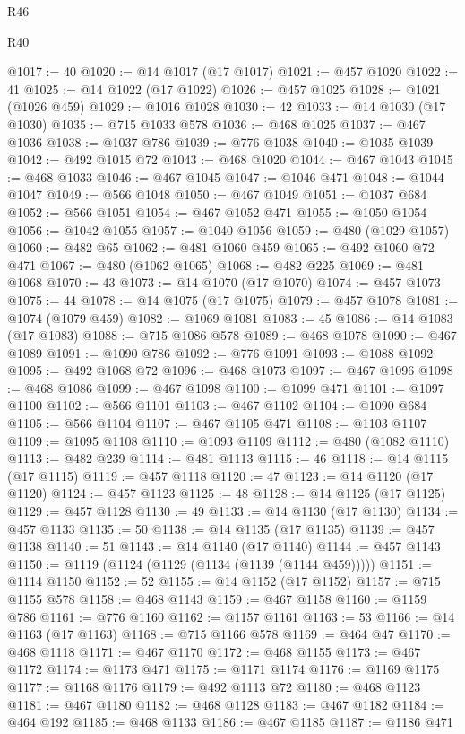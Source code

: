 \begin{lexlean}{R46}
\begin{lexlean}{R40}
\begin{coremodule}
{{{{{{{{{{{{{{{{{{{{{{{{{{{{{{{{{{{{{{{{{{{{{{{{{{{{{{{{{{{{{{{{{{{{{{{{{{{{{{{{{{{{{{{{{{{{{{{{{{{{{{{{{{{{{@1017 := 40
@1020 := @14 @1017 (@17 @1017)
@1021 := @457 @1020
@1022 := 41
@1025 := @14 @1022 (@17 @1022)
@1026 := @457 @1025
@1028 := @1021 (@1026 @459)
@1029 := @1016 @1028
@1030 := 42
@1033 := @14 @1030 (@17 @1030)
@1035 := @715 @1033 @578
@1036 := @468 @1025
@1037 := @467 @1036
@1038 := @1037 @786
@1039 := @776 @1038
@1040 := @1035 @1039
@1042 := @492 @1015 @72
@1043 := @468 @1020
@1044 := @467 @1043
@1045 := @468 @1033
@1046 := @467 @1045
@1047 := @1046 @471
@1048 := @1044 @1047
@1049 := @566 @1048
@1050 := @467 @1049
@1051 := @1037 @684
@1052 := @566 @1051
@1054 := @467 @1052 @471
@1055 := @1050 @1054
@1056 := @1042 @1055
@1057 := @1040 @1056
@1059 := @480 (@1029 @1057)
@1060 := @482 @65
@1062 := @481 @1060 @459
@1065 := @492 @1060 @72 @471
@1067 := @480 (@1062 @1065)
@1068 := @482 @225
@1069 := @481 @1068
@1070 := 43
@1073 := @14 @1070 (@17 @1070)
@1074 := @457 @1073
@1075 := 44
@1078 := @14 @1075 (@17 @1075)
@1079 := @457 @1078
@1081 := @1074 (@1079 @459)
@1082 := @1069 @1081
@1083 := 45
@1086 := @14 @1083 (@17 @1083)
@1088 := @715 @1086 @578
@1089 := @468 @1078
@1090 := @467 @1089
@1091 := @1090 @786
@1092 := @776 @1091
@1093 := @1088 @1092
@1095 := @492 @1068 @72
@1096 := @468 @1073
@1097 := @467 @1096
@1098 := @468 @1086
@1099 := @467 @1098
@1100 := @1099 @471
@1101 := @1097 @1100
@1102 := @566 @1101
@1103 := @467 @1102
@1104 := @1090 @684
@1105 := @566 @1104
@1107 := @467 @1105 @471
@1108 := @1103 @1107
@1109 := @1095 @1108
@1110 := @1093 @1109
@1112 := @480 (@1082 @1110)
@1113 := @482 @239
@1114 := @481 @1113
@1115 := 46
@1118 := @14 @1115 (@17 @1115)
@1119 := @457 @1118
@1120 := 47
@1123 := @14 @1120 (@17 @1120)
@1124 := @457 @1123
@1125 := 48
@1128 := @14 @1125 (@17 @1125)
@1129 := @457 @1128
@1130 := 49
@1133 := @14 @1130 (@17 @1130)
@1134 := @457 @1133
@1135 := 50
@1138 := @14 @1135 (@17 @1135)
@1139 := @457 @1138
@1140 := 51
@1143 := @14 @1140 (@17 @1140)
@1144 := @457 @1143
@1150 := @1119 (@1124 (@1129 (@1134 (@1139 (@1144 @459)))))
@1151 := @1114 @1150
@1152 := 52
@1155 := @14 @1152 (@17 @1152)
@1157 := @715 @1155 @578
@1158 := @468 @1143
@1159 := @467 @1158
@1160 := @1159 @786
@1161 := @776 @1160
@1162 := @1157 @1161
@1163 := 53
@1166 := @14 @1163 (@17 @1163)
@1168 := @715 @1166 @578
@1169 := @464 @47
@1170 := @468 @1118
@1171 := @467 @1170
@1172 := @468 @1155
@1173 := @467 @1172
@1174 := @1173 @471
@1175 := @1171 @1174
@1176 := @1169 @1175
@1177 := @1168 @1176
@1179 := @492 @1113 @72
@1180 := @468 @1123
@1181 := @467 @1180
@1182 := @468 @1128
@1183 := @467 @1182
@1184 := @464 @192
@1185 := @468 @1133
@1186 := @467 @1185
@1187 := @1186 @471
}}}}}}}}}}}}}}}}}}}}}}}}}}}}}}}}}}}}}}}}}}}}}}}}}}}}}}}}}}}}}}}}}}}}}}}}}}}}}}}}}}}}}}}}}}}}}}}}}}}}}}}}}}}}}
\end{coremodule}
\end{lexlean}
\end{lexlean}

